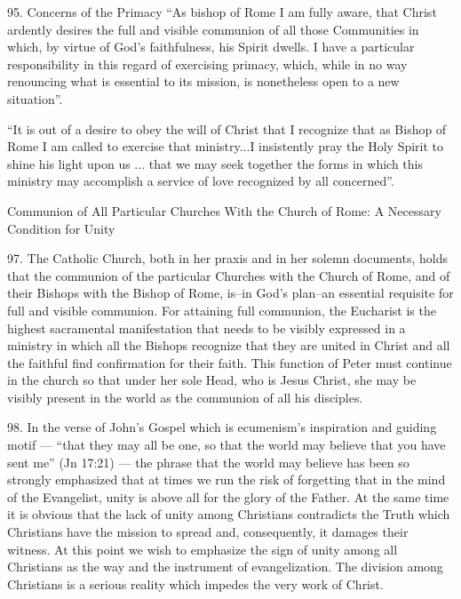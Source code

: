 \documentclass[oneside]{book}
\begin{document}
95. Concerns of the Primacy  ``As bishop of Rome  I am fully aware,  that Christ
ardently desires the full and visible communion of all those Communities in
which, by virtue of God's faithfulness, his Spirit dwells. I have a particular
responsibility in this regard of exercising primacy, which, while in no way
renouncing what is essential to its mission, is nonetheless open to a new
situation''.

``It is out of a desire to obey the will of Christ that I recognize that as
Bishop of Rome I am called to exercise that ministry...I insistently pray the
Holy Spirit to shine his light upon us ... that we may seek together the forms
in which this ministry may accomplish a service of love recognized by all
concerned''.

Communion of All Particular Churches With the Church of Rome:  A Necessary
Condition for Unity

97.  The Catholic Church, both in her praxis and in her solemn documents, holds
that the communion of the particular Churches with the Church of Rome, and of
their Bishops with the Bishop of Rome, is--in God's plan--an essential requisite
for full and visible communion. For attaining full communion, the Eucharist is
the highest sacramental manifestation that needs to be visibly expressed in a
ministry in which all the Bishops recognize that they are united in Christ and
all the faithful find confirmation for their faith. This function of Peter must
continue in the church so that under her sole Head, who is Jesus Christ, she may
be visibly present in the world as the communion of all his disciples.

98. In the verse of John's Gospel which is ecumenism's inspiration and guiding
motif --- ``that they may all be one, so that the world may believe that you
have sent me'' (Jn 17:21) --- the phrase  that the world may believe has been so
strongly emphasized that at times we run the risk of forgetting that in the mind
of the Evangelist, unity is above all for the glory of the Father. At the same
time it is obvious that the lack of unity among Christians contradicts the Truth
which Christians have the mission to spread and,  consequently,  it damages
their witness. At this point we wish to emphasize the sign of unity among all
Christians as the way and the instrument of evangelization. The division among
Christians is a serious reality which impedes the very work of Christ.

\end{document}

